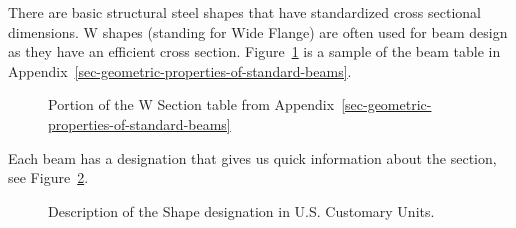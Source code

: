 \documentclass[
  letterpaper,
  DIV=11,
  numbers=noendperiod]{scrreprt}
\theoremstyle{definition}
\theoremstyle{remark}
\begin{document}
There are basic structural steel shapes that have standardized cross
sectional dimensions. W shapes (standing for Wide Flange) are often used
for beam design as they have an efficient cross section.
Figure~\ref{fig-9.10} is a sample of the beam table in
Appendix~\ref{sec-geometric-properties-of-standard-beams}.

\begin{figure}


\caption{\label{fig-9.10}Portion of the W Section table from
Appendix~\ref{sec-geometric-properties-of-standard-beams}}

\end{figure}%

Each beam has a designation that gives us quick information about the
section, see Figure~\ref{fig-9.11}.

\begin{figure}


\caption{\label{fig-9.11}Description of the Shape designation in U.S.
Customary Units.}

\end{figure}%
\end{document}
